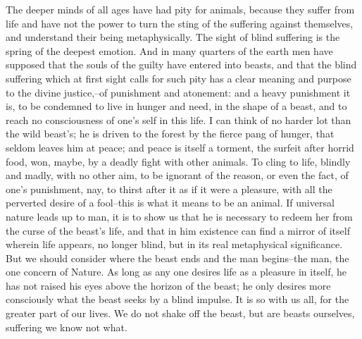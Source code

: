The deeper minds of all ages have had pity for animals, because they
suffer from life and have not the power to turn the sting of the
suffering against themselves, and understand their being
metaphysically. The sight of blind suffering is the spring of the
deepest emotion. And in many quarters of the earth men have supposed
that the souls of the guilty have entered into beasts, and that the
blind suffering which at first sight calls for such pity has a clear
meaning and purpose to the divine justice,--of punishment and
atonement: and a heavy punishment it is, to be condemned to live in
hunger and need, in the shape of a beast, and to reach no
consciousness of one's self in this life. I can think of no harder
lot than the wild beast's; he is driven to the forest by the fierce
pang of hunger, that seldom leaves him at peace; and peace is itself
a torment, the surfeit after horrid food, won, maybe, by a deadly
fight with other animals. To cling to life, blindly and madly, with
no other aim, to be ignorant of the reason, or even the fact, of
one's punishment, nay, to thirst after it as if it were a pleasure,
with all the perverted desire of a fool--this is what it means to be
an animal. If universal nature leads up to man, it is to show us that
he is necessary to redeem her from the curse of the beast's life, and
that in him existence can find a mirror of itself wherein life
appears, no longer blind, but in its real metaphysical significance.
But we should consider where the beast ends and the man begins--the
man, the one concern of Nature. As long as any one desires life as a
pleasure in itself, he has not raised his eyes above the horizon of
the beast; he only desires more consciously what the beast seeks by a
blind impulse. It is so with us all, for the greater part of our
lives. We do not shake off the beast, but are beasts ourselves,
suffering we know not what.

